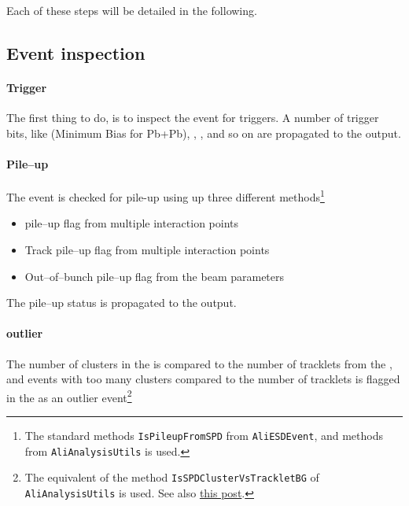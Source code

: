 Each of these steps will be detailed in the following. 

\subsection{Event inspection}
\label{sec:sub:event_inspection}

\paragraph{Trigger} 
The first thing to do, is to inspect the event for triggers.  A number
of trigger bits, like \INEL{} (Minimum Bias for Pb+Pb), \INELONE{},
\NSD{}, and so on are propagated to the \AOD{} output.

\paragraph{Pile--up} 
The event is checked for pile-up using up three different
methods\footnote{The standard methods \texttt{IsPileupFromSPD} from
  \texttt{AliESDEvent}, and methods from \texttt{AliAnalysisUtils} is
  used.} 
\begin{itemize}
\item \SPD{} pile--up flag from multiple interaction points
\item Track pile--up flag from multiple interaction points
\item Out--of--bunch pile--up flag from the beam parameters 
\end{itemize}
The pile--up status is propagated to the \AOD{} output.  

\paragraph{\SPD{} outlier} 
The number of clusters in the \SPD{} is compared to the number of
tracklets from the \SPD{}, and events with too many clusters compared
to the number of tracklets is flagged in the \AOD{} as an outlier
event\footnote{The equivalent of the method
  \texttt{IsSPDClusterVsTrackletBG} of \texttt{AliAnalysisUtils} is
  used.  See also
  \href{https://groups.cern.ch/group/alice-analysis-operations/Lists/Archive/Flat.aspx?RootFolder=\%2Fgroup\%2Falice-analysis-operations\%2FLists\%2FArchive\%2FSPD\%20cluster-vs-tracklet\%20cut\%20for\%20background\%20rejection&FolderCTID=0x01200200726CA2ECC2B5D14F9300A07F2C08D3A2}{this post}.}

